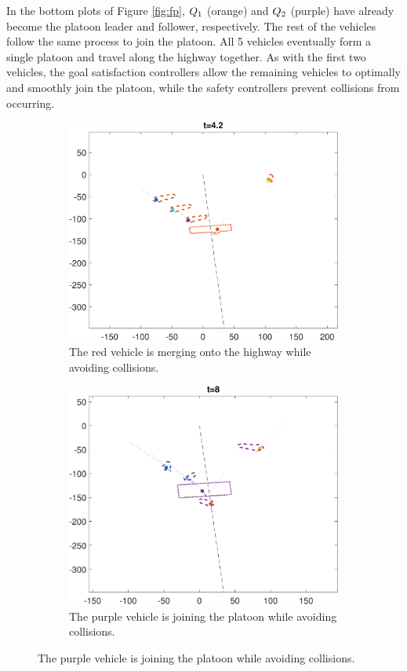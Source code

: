 In the bottom plots of Figure \ref{fig:fp}, $Q_{1}$ (orange) and $Q_{2}$ (purple) have already become the platoon leader and follower, respectively. The rest of the vehicles follow the same process to join the platoon. All 5 vehicles eventually form a single platoon and travel along the highway together. As with the first two vehicles, the goal satisfaction controllers allow the remaining vehicles to optimally and smoothly join the platoon, while the safety controllers prevent collisions from occurring.

\begin{figure}[h!]
    \centering
    \begin{subfigure}[t]{0.9\columnwidth} \label{subfig:fp_43}
        \includegraphics[width=\columnwidth]{fp_43}
        \caption{The red vehicle is merging onto the highway while avoiding collisions.}
    \end{subfigure}
    \begin{subfigure}[t]{0.9\columnwidth} \label{subfig:fp_81}
        \includegraphics[width=\columnwidth]{fp_81}
        \caption{The purple vehicle is joining the platoon while avoiding collisions.}
    \end{subfigure}


\end{figure}
